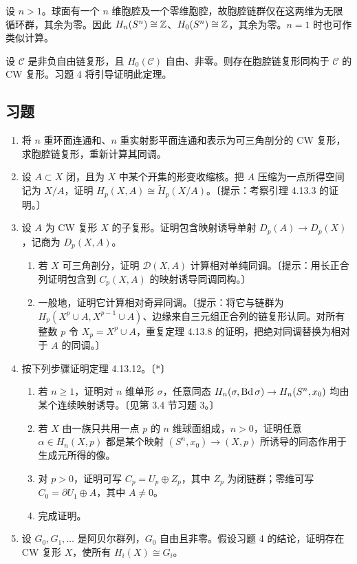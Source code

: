 设 $n>1$。球面有一个 $n$ 维胞腔及一个零维胞腔，故胞腔链群仅在这两维为无限循环群，其余为零。因此 $H_n(S^n)\cong\mathbb{Z}$、$H_0(S^n)\cong\mathbb{Z}$，其余为零。$n=1$ 时也可作类似计算。

设 $\mathcal C$ 是非负自由链复形，且 $H_0(\mathcal C)$ 自由、非零。则存在胞腔链复形同构于 $\mathcal C$ 的 CW 复形。习题 4 将引导证明此定理。

\subsection*{习题}
\begin{enumerate}
\item 将 $n$ 重环面连通和、$n$ 重实射影平面连通和表示为可三角剖分的 CW 复形，求胞腔链复形，重新计算其同调。
\item 设 $A\subset X$ 闭，且为 $X$ 中某个开集的形变收缩核。把 $A$ 压缩为一点所得空间记为 $X/A$，证明 $H_p(X,A)\cong\widetilde H_p(X/A)$。〔提示：考察引理 4.13.3 的证明。〕
\item 设 $A$ 为 CW 复形 $X$ 的子复形。证明包含映射诱导单射 $D_p(A)\to D_p(X)$，记商为 $D_p(X,A)$。
\begin{enumerate}[label=(\alph*)]
\item 若 $X$ 可三角剖分，证明 $\mathcal D(X,A)$ 计算相对单纯同调。〔提示：用长正合列证明包含到 $C_p(X,A)$ 的映射诱导同调同构。〕
\item 一般地，证明它计算相对奇异同调。〔提示：将它与链群为 $H_p(X^p\cup A,X^{p-1}\cup A)$、边缘来自三元组正合列的链复形认同。对所有整数 $p$ 令 $X_p=X^p\cup A$，重复定理 4.13.8 的证明，把绝对同调替换为相对于 $A$ 的同调。〕
\end{enumerate}
\item 按下列步骤证明定理 4.13.12。〔*〕
\begin{enumerate}[label=(\alph*)]
\item 若 $n\ge1$，证明对 $n$ 维单形 $\sigma$，任意同态 $H_n(\sigma,\operatorname{Bd}\sigma)\to H_n(S^n,x_0)$ 均由某个连续映射诱导。〔见第 3.4 节习题 3。〕
\item 若 $X$ 由一族只共用一点 $p$ 的 $n$ 维球面组成，$n>0$，证明任意 $\alpha\in H_n(X,p)$ 都是某个映射 $(S^n,x_0)\to(X,p)$ 所诱导的同态作用于生成元所得的像。
\item 对 $p>0$，证明可写 $C_p=U_p\oplus Z_p$，其中 $Z_p$ 为闭链群；零维可写 $C_0=\partial U_1\oplus A$，其中 $A\ne0$。
\item 完成证明。
\end{enumerate}
\item 设 $G_0,G_1,\ldots$ 是阿贝尔群列，$G_0$ 自由且非零。假设习题 4 的结论，证明存在 CW 复形 $X$，使所有 $H_i(X)\cong G_i$。
\end{enumerate}
